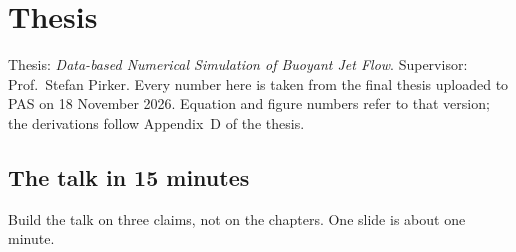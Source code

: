 \section{Thesis}

Thesis: \emph{Data-based Numerical Simulation of Buoyant Jet Flow}. Supervisor: Prof.\ Stefan
Pirker. Every number here is taken from the final thesis uploaded to PAS on 18 November 2026.
Equation and figure numbers refer to that version; the derivations follow Appendix~D of the thesis.

\subsection{The talk in 15 minutes}

Build the talk on three claims, not on the chapters. One slide is about one minute.

